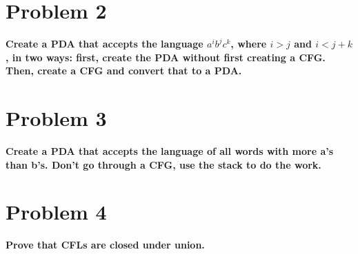 \documentclass[11pt, a4paper]{article} %
\begin{document}
\newpage
\section*{Problem 2} \textbf{Create a PDA that accepts the language $a^ib^jc^k$,
  where $i>j$ and $i<j+k$, in two ways: first, create the PDA without first creating a CFG.
Then, create a CFG and convert that to a PDA.}
\newpage
\section*{Problem 3} \textbf{Create a PDA that accepts the language of all
  words with more a's than b's. Don't go through a CFG, use the stack to do the
  work.}
\newpage
\section*{Problem 4} \textbf{Prove that CFLs are closed under union.}
\end{document}
